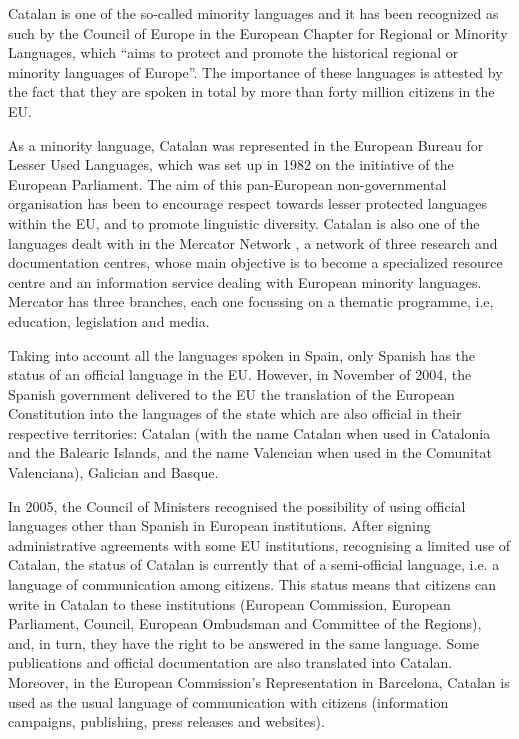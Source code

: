 \begin{multicols}{2}
Catalan is one of the so-called minority languages and it has been recognized as such by the Council of Europe in the European Chapter for Regional or Minority Languages, which “aims to protect and promote the historical regional or minority languages of Europe”. The importance of these languages is attested by the fact that they are spoken in total by more than forty million citizens in the EU.

As a minority language, Catalan was represented in the European Bureau for Lesser Used Languages, which was set up in 1982 on the initiative of the European Parliament. The aim of this pan-European non-governmental organisation has been to encourage respect towards lesser protected languages within the EU, and to promote linguistic diversity. Catalan is also one of the languages dealt with in the Mercator Network \cite{CAT-Nota8}, a network of three research and documentation centres, whose main objective is to become a specialized resource centre and an information service dealing with European minority languages. Mercator has three branches, each one focus\-sing on a thematic programme, i.e, education, legislation and media.

Taking into account all the languages spoken in Spain, only Spanish has the status of an official language in the EU.  However, in November of 2004, the Spanish government delivered to the EU the translation of the European Constitution into the languages of the state which are also official in their respective territories: Catalan (with the name Catalan when used in Catalonia and the Balearic Islands, and the name Valencian when used in the Comunitat Valenciana), Galician and Basque. 

In 2005, the Council of Ministers recognised the possibility of using official languages other than Spanish in European institutions. After signing administrative agreements with some EU institutions, recognising a limited use of Catalan, the status of Catalan is currently that of a semi-official language, i.e. a language of communication among citizens. This status means that citizens can write in Catalan to these institutions (European Commission, European Parliament, Council, European Ombudsman and Committee of the Regions), and, in turn, they have the right to be answered in the same language. Some publications and official documentation are also translated into Catalan. Moreover, in the European Commission’s Representation in Barcelona, Catalan is used as the usual language of communication with citizens (information campaigns, publishing, press releases and websites).


\end{multicols}
